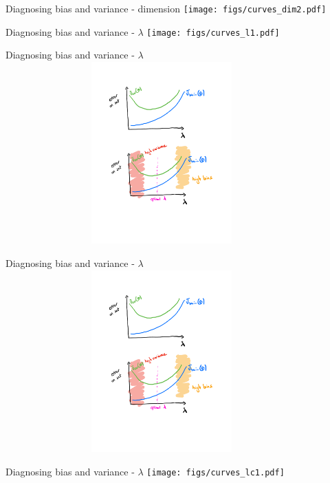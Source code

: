 \documentclass[usenames,dvipsnames]{beamer}
\begin{document}
\begin{frame}{Diagnosing bias and variance - dimension}
\centering
    \texttt{[image: figs/curves\_dim2.pdf]} 
\end{frame}

\begin{frame}{Diagnosing bias and variance - $\lambda$}
\centering
    \texttt{[image: figs/curves\_l1.pdf]} 
\end{frame}

\begin{frame}{Diagnosing bias and variance - $\lambda$}
\centering
    \includegraphics[width=12cm,height=7cm]{figs/curves_l2.pdf} 
\end{frame}

\begin{frame}{Diagnosing bias and variance - $\lambda$}
\centering
    \includegraphics[width=12cm,height=7cm]{figs/curves_l2.pdf} 
\end{frame}


\begin{frame}{Diagnosing bias and variance - $\lambda$}
\centering
    \texttt{[image: figs/curves\_lc1.pdf]} 
\end{frame}
\end{document}
